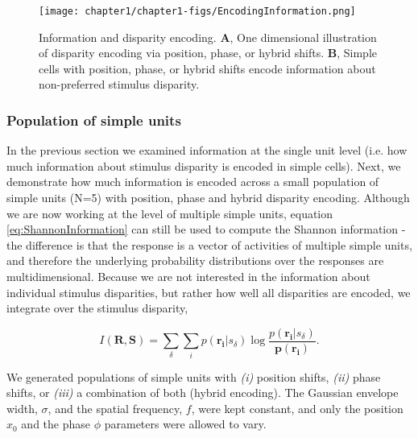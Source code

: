 \begin{figure}
  \centering
  \texttt{[image: chapter1/chapter1-figs/EncodingInformation.png]}
  \caption[Information and disparity encoding in simple cells.]{Information and disparity encoding. \textbf{A}, One dimensional illustration of disparity encoding via position, phase, or hybrid shifts. \textbf{B}, Simple cells with position, phase, or hybrid shifts encode information about non-preferred stimulus disparity.}
  \label{fig:DispEnc}
\end{figure}

\subsubsection*{Population of simple units}

In the previous section we examined information at the single unit level (i.e. how much information about stimulus disparity is encoded in simple cells). Next, we demonstrate how much information is encoded across a small population of simple units (N=5) with position, phase and hybrid disparity encoding. Although we are now working at the level of multiple simple units, equation \ref{eq:ShannonInformation} can still be used to compute the Shannon information - the difference is that the response is a vector of activities of multiple simple units, and therefore the underlying probability distributions over the responses are multidimensional. Because we are not interested in the information about individual stimulus disparities, but rather how well all disparities are encoded, we integrate over the stimulus disparity,   

\begin{equation}
  I(\mathbf{R}, \mathbf{S}) = \sum_\delta \sum_i p(\mathbf{r_i}|s_\delta) \log \frac{p(\mathbf{r_i}|s_\delta)}{\mathbf{p(r_i)}}.
  \label{eq:ShannonInformationVector}
\end{equation}

We generated populations of simple units with \textit{(i)} position shifts, \textit{(ii)} phase shifts, or \textit{(iii)} a combination of both (hybrid encoding). The Gaussian envelope width, $\sigma$, and the spatial frequency, $f$, were kept constant, and only the position $x_0$ and the phase $\phi$ parameters were allowed to vary. 

